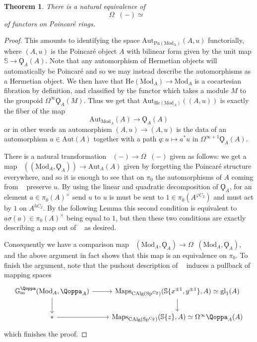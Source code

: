 \documentclass{article}
\DeclareMathOperator{\CAlg}{CAlg} %
\DeclareMathOperator{\Picp}{Pic^p} %
\DeclareMathOperator{\gmq}{\mathbb{G}_m^\Qoppa}
\renewcommand{\phi}{\varphi}
\newtheorem{theorem}[equation]{Theorem}
\theoremstyle{definition}
\begin{document}
\begin{theorem}
	There is a natural equivalence of \[\Omega \Picp(-)\simeq \gmq\] of functors on Poincar{\'e} rings.
\end{theorem}
\begin{proof}
	This amounts to identifying the space $\mathrm{Aut}_{\mathrm{Pn(\mathrm{Mod}_A)}}(A,u)$ functorially, where $(A,u)$ is the Poincar{\'e} object $A$ with bilinear form given by the unit map $\mathbb{S}\to \Qoppa_A(A)$. Note that any automorphism of Hermetian objects will automatically be Poincar{\'e} and so we may instead describe the automorphisms as a Hermetian object. We then have that $\mathrm{He}(\mathrm{Mod}_A)\to \mathrm{Mod}_A$ is a cocartesian fibration by definition, and classified by the functor which takes a module $M$ to the groupoid $\Omega^\infty \Qoppa_A(M)$. Thus we get that $\mathrm{Aut}_{\mathrm{He}(\mathrm{Mod}_A)}((A,u))$ is exactly the fiber of the map \[\mathrm{Aut}_{\mathrm{Mod}_A}(A)\to \Qoppa_A(A)\] or in other words an automorphism $(A,u)\to (A,u)$ is the data of an automorphism $a\in \mathrm{Aut}(A)$ together with a path $q:u\mapsto a^*u$ in $\Omega^{\infty +1}\Qoppa_A(A)$.  
	
	There is a natural transformation $\gmq(-)\to \Omega\Picp(-)$ given as follows: we get a map $\gmq((\mathrm{Mod}_A, \Qoppa_A))\to \mathrm{Aut}_A(A)$ given by forgetting the Poincar{\'e} structure everywhere, and so it is enough to see that on $\pi_0$ the automorphisms of $A$ coming from $\gmq$ preserve $u$. By using the linear and quadratic decomposition of $\Qoppa_A$, for an element $a\in \pi_0(A)^\times$ send $u$ to $u$ is must be sent to $1\in \pi_0(A^{\phi C_2})$ and must act by $1$ on $A^{hC_2}$. By the following Lemma this second condition is equivalent to $a\sigma(a)\in \pi_0(A)^\times$ being equal to $1$, but then these two conditions are exactly describing a map out of $\gmq$ as desired. 
	
	Consequently we have a comparison map $\gmq(\mathrm{Mod}_A, \Qoppa_A)\to \Omega\Picp(\mathrm{Mod}_A,\Qoppa_A)$, and the above argument in fact shows that this map is an equivalence on $\pi_0$. To finish the argument, note that the pushout description of $\gmq$ induces a pullback of mapping spaces 
	\[
	\begin{tikzcd}
		\gmq(\mathrm{Mod}_A, \Qoppa_A) \ar[d] \ar[r] & \mathrm{Maps}_{\CAlg(\mathrm{Sp}^{C_2})}(\mathbb{S}\{x^{\pm 1}, y^{\pm 1}\}, A)\simeq \mathrm{gl}_1(A)\ar[d]\\
		* \ar[r] & \mathrm{Maps}_{\CAlg(\mathrm{Sp^{C_2}})}(\mathbb{S}\{z\},A)\simeq \Omega^\infty\Qoppa_A(A) 
	\end{tikzcd}
	\] which finishes the proof.
\end{proof}
\end{document}
